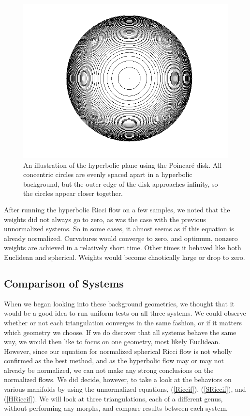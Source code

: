 \documentclass[12pt]{article}
\begin{document}
\begin{figure}
\centering
\includegraphics[scale = 0.5]{Pictures/pDisk.png}
\caption{An illustration of the hyperbolic plane using the Poincar\'{e} disk. All concentric circles are evenly spaced apart in a hyperbolic background, but the outer edge of the disk approaches infinity, so the circles appear closer together.}
\label{PD}
\end{figure}

\noindent After running the hyperbolic Ricci flow on a few samples, we noted that the weights did not always go to zero, as was the case with the previous unnormalized systems. So in some cases, it almost seems as if this equation is already normalized. Curvatures would converge to zero, and optimum, nonzero weights are achieved in a relatively short time. Other times it behaved like both Euclidean and spherical. Weights would become chaotically large or drop to zero.  

\subsection{Comparison of Systems}

When we began looking into these background geometries, we thought that it would be a good idea to run uniform tests on all three systems. We could observe whether or not each triangulation converges in the same fashion, or if it matters which geometry we choose. If we do discover that all systems behave the same way, we would then like to focus on one geometry, most likely Euclidean. However, since our equation for normalized spherical Ricci flow is not wholly confirmed as the best method, and as the hyperbolic flow may or may not already be normalized, we can not make any strong conclusions on the normalized flows. We did decide, however, to take a look at the behaviors on various manifolds by using the unnormalized equations, (\ref{Riccif}), (\ref{SRiccif}), and (\ref{HRiccif}). We will look at three triangulations, each of a different genus, without performing any morphs, and compare results between each system. \newline
\end{document}
